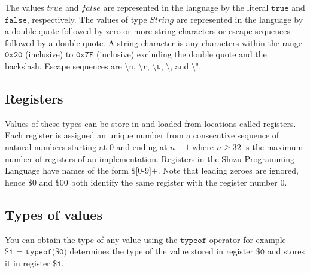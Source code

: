 \documentclass{article}
\newcommand{\myproject}{Shizu}
\begin{document}
The values $\textit{true}$ and $\textit{false}$ are represented in the language by
the literal $\texttt{true}$ and $\texttt{false}$, respectively. The values of type
$\textit{String}$ are represented in the language by a double quote followed by zero
or more string characters or escape sequences followed by a double quote. 
A string character is any characters within the range $\texttt{0x20}$ (inclusive) to $\texttt{0x7E}$
(inclusive) excluding the double quote and the backslash. Escape sequences are $\texttt{\textbackslash n}$,
$\texttt{\textbackslash r}$, $\texttt{\textbackslash t}$, $\texttt{\textbackslash}$, and $\texttt{\textbackslash "}$.

\noindent{}

\subsection{Registers}
Values of these types can be store in and loaded from locations called registers. Each register is assigned an unique
number from a consecutive sequence of natural numbers starting at $0$ and ending at $n-1$ where $n \geq 32$ is the
maximum number of registers of an implementation. Registers in the \myproject{} Programming Language have names of the
form $\textit{\$[0-9]+}$. Note that leading zeroes are ignored, hence $\$0$ and $\$00$ both identify the same register
with the register number $0$.

\subsection{Types of values}
You can obtain the type of any value using the $\texttt{typeof}$ operator for example $\texttt{\$1 = typeof(\$0)}$
determines the type of the value stored in register $\texttt{\$0}$ and stores it in register $\texttt{\$1}$.
\end{document}

